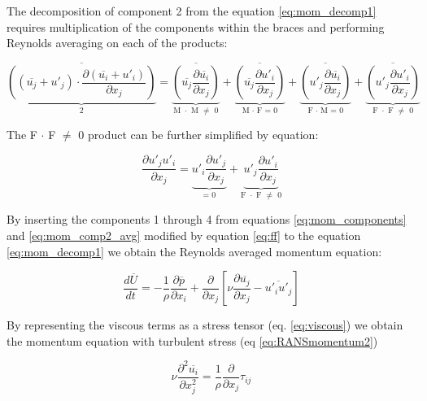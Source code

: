 The decomposition of component 2 from the equation \ref{eq:mom_decomp1} requires multiplication of the components within the braces and performing Reynolds averaging on each of the products: 

\begin{equation} \label{eq:mom_comp2_avg}
\underbrace{\overline {\left( \left( \overline{u_j} + u'_j \right) \cdot \frac{\partial \left( \overline{u_i} + u'_i \right)}{\partial x_j} \right)}}_\text{2}
= \underbrace{\overline{\left( \overline{u_j} \frac{\partial \overline{u_i}}{\partial x_j} \right)}}_\text{M $\cdot$ M $\neq$ 0}
+ \underbrace{\overline{\left( \overline{u_j} \frac{\partial u'_i}{\partial x_j} \right)}}_\text{M $\cdot$ F = 0}
+ \underbrace{\overline{\left( u'_j \frac{\partial \overline{u_i}}{\partial x_j} \right)}}_\text{F $\cdot$ M = 0}
+ \underbrace{\overline{\left( u'_j \frac{\partial u'_i}{\partial x_j} \right)}}_\text{F $\cdot$ F $\neq$ 0}
\end{equation}

The F $\cdot$ F $\neq$ 0 product can be further simplified by equation:

\begin{equation} \label{eq:ff}
\frac{\partial u'_j u'_i}{\partial x_j}
= \underbrace{u'_i \frac{\partial u'_j}{\partial x_j}}_\text{= 0}
+ \underbrace{u'_j \frac{\partial u'_i}{\partial x_j}}_\text{F $\cdot$ F $\neq$ 0}
\end{equation}

By inserting the components 1 through 4 from equations \ref{eq:mom_components} and \ref{eq:mom_comp2_avg} modified by equation \ref{eq:ff} to the equation \ref{eq:mom_decomp1} we obtain the Reynolds averaged momentum equation:

\begin{equation} \label{eq:RANSmomentum}
\frac{d \overline{U}}{dt}
=
- \frac{1}{\rho} \frac{\partial \overline{p}}{\partial x_i}
+ \frac{\partial}{\partial x_j} \left[ \nu \frac{\partial \overline{u_j}}{\partial x_j} - \overline{u'_i u'_j}\right]
\end{equation}

By representing the viscous terms as a stress tensor (eq. \ref{eq:viscous}) we obtain the momentum equation with turbulent stress (eq \ref{eq:RANSmomentum2})

\begin{equation} \label{eq:viscous}
\nu \frac{\partial^2 \overline{u_i}}{\partial x_j^2}
=
\frac{1}{\rho} \frac{\partial}{\partial x_j} \tau_{ij}
\end{equation}

